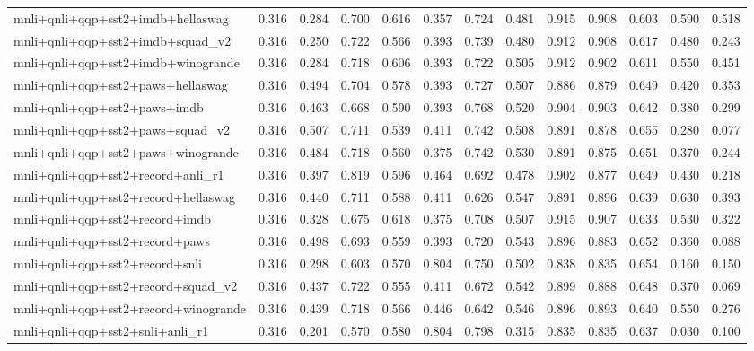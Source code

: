 \begin{table}[t]
\begin{tabular}{lrrrrrrrrrrrr}
    mnli+qnli+qqp+sst2+imdb+hellaswag & 0.316 & 0.284 & 0.700 & 0.616 & 0.357 & 0.724 & 0.481 & 0.915 & 0.908 & 0.603 & 0.590 & 0.518 \\
    mnli+qnli+qqp+sst2+imdb+squad\_v2 & 0.316 & 0.250 & 0.722 & 0.566 & 0.393 & 0.739 & 0.480 & 0.912 & 0.908 & 0.617 & 0.480 & 0.243 \\
    mnli+qnli+qqp+sst2+imdb+winogrande & 0.316 & 0.284 & 0.718 & 0.606 & 0.393 & 0.722 & 0.505 & 0.912 & 0.902 & 0.611 & 0.550 & 0.451 \\
    mnli+qnli+qqp+sst2+paws+hellaswag & 0.316 & 0.494 & 0.704 & 0.578 & 0.393 & 0.727 & 0.507 & 0.886 & 0.879 & 0.649 & 0.420 & 0.353 \\
    mnli+qnli+qqp+sst2+paws+imdb & 0.316 & 0.463 & 0.668 & 0.590 & 0.393 & 0.768 & 0.520 & 0.904 & 0.903 & 0.642 & 0.380 & 0.299 \\
    mnli+qnli+qqp+sst2+paws+squad\_v2 & 0.316 & 0.507 & 0.711 & 0.539 & 0.411 & 0.742 & 0.508 & 0.891 & 0.878 & 0.655 & 0.280 & 0.077 \\
    mnli+qnli+qqp+sst2+paws+winogrande & 0.316 & 0.484 & 0.718 & 0.560 & 0.375 & 0.742 & 0.530 & 0.891 & 0.875 & 0.651 & 0.370 & 0.244 \\
    mnli+qnli+qqp+sst2+record+anli\_r1 & 0.316 & 0.397 & 0.819 & 0.596 & 0.464 & 0.692 & 0.478 & 0.902 & 0.877 & 0.649 & 0.430 & 0.218 \\
    mnli+qnli+qqp+sst2+record+hellaswag & 0.316 & 0.440 & 0.711 & 0.588 & 0.411 & 0.626 & 0.547 & 0.891 & 0.896 & 0.639 & 0.630 & 0.393 \\
    mnli+qnli+qqp+sst2+record+imdb & 0.316 & 0.328 & 0.675 & 0.618 & 0.375 & 0.708 & 0.507 & 0.915 & 0.907 & 0.633 & 0.530 & 0.322 \\
    mnli+qnli+qqp+sst2+record+paws & 0.316 & 0.498 & 0.693 & 0.559 & 0.393 & 0.720 & 0.543 & 0.896 & 0.883 & 0.652 & 0.360 & 0.088 \\
    mnli+qnli+qqp+sst2+record+snli & 0.316 & 0.298 & 0.603 & 0.570 & 0.804 & 0.750 & 0.502 & 0.838 & 0.835 & 0.654 & 0.160 & 0.150 \\
    mnli+qnli+qqp+sst2+record+squad\_v2 & 0.316 & 0.437 & 0.722 & 0.555 & 0.411 & 0.672 & 0.542 & 0.899 & 0.888 & 0.648 & 0.370 & 0.069 \\
    mnli+qnli+qqp+sst2+record+winogrande & 0.316 & 0.439 & 0.718 & 0.566 & 0.446 & 0.642 & 0.546 & 0.896 & 0.893 & 0.640 & 0.550 & 0.276 \\
    mnli+qnli+qqp+sst2+snli+anli\_r1 & 0.316 & 0.201 & 0.570 & 0.580 & 0.804 & 0.798 & 0.315 & 0.835 & 0.835 & 0.637 & 0.030 & 0.100 \\

\end{tabular}
\end{table}
